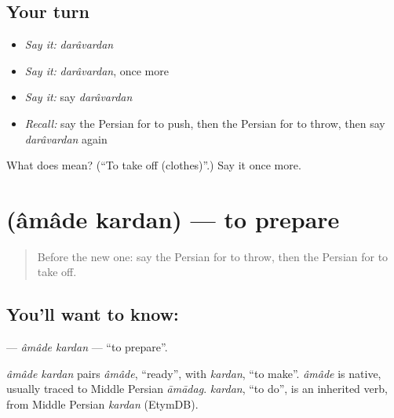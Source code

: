 \subsection*{Your turn}
\begin{itemize}
\raggedright
  \item \emph{Say it:} \emph{darâvardan}
  \item \emph{Say it:} \emph{darâvardan}, once more
  \item \emph{Say it:} say \emph{darâvardan}
  \item \emph{Recall:} say the Persian for to push, then the Persian for to throw, then say \emph{darâvardan} again
\end{itemize}

\begin{tcolorbox}[breakable,colback=teal!4,colframe=teal!35!black,title={Before you move on}]
What does  mean? (\textquotedblleft{}To take off (clothes)\textquotedblright{}.) Say it once more.
\end{tcolorbox}
\section[\texorpdfstring{\fa{آماده} \fa{کردن} (âmâde kardan)}{آماده کردن (âmâde kardan)}]{  (âmâde kardan) — to prepare}

\label{lesson:FA-C254-amade-kardan}



\begin{quote}
Before the new one: say the Persian for to throw, then the Persian for to take off.
\end{quote}

\subsection*{You'll want to know:  }
\textbf{ } — \emph{âmâde kardan} — \textquotedblleft{}to prepare\textquotedblright{}.

\begin{cousinweb}
\emph{âmâde kardan} pairs \emph{âmâde}, \textquotedblleft{}ready\textquotedblright{}, with \emph{kardan}, \textquotedblleft{}to make\textquotedblright{}. \emph{âmâde} is native, usually traced to Middle Persian \emph{āmādag}. \emph{kardan}, \textquotedblleft{}to do\textquotedblright{}, is an inherited verb, from Middle Persian \emph{kardan} (EtymDB).
\end{cousinweb}

